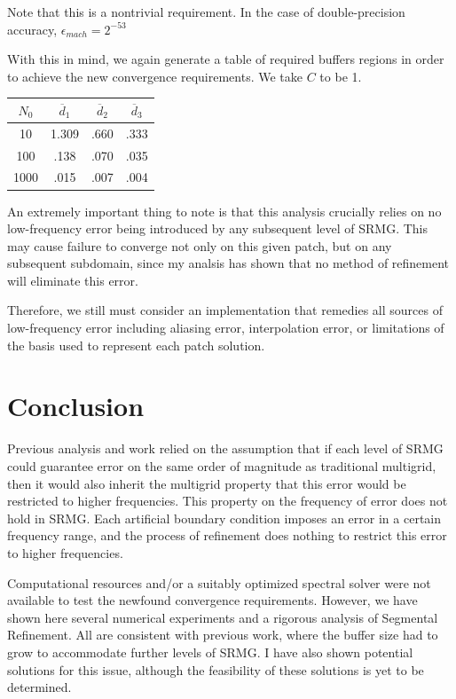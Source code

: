 \documentclass[final]{siamart1116}
\numberwithin{theorem}{section}
\begin{document}
Note that this is a nontrivial requirement. In the case of double-precision accuracy, $\epsilon_{mach} = 2^{-53}$

With this in mind, we again generate a table of required buffers regions in order to achieve the new convergence requirements. We take $C$ to be 1. 

\begin{center}
\begin{tabular}{c | c |  c | c}
$N_0$  & $\overline d_1$ & $\overline d_2$ & $\overline d_3$\\
\hline
10 &  1.309 & .660 & .333\\ 
\hline
100 & .138 & .070 & .035 \\
\hline
1000 & .015   &  .007 & .004\\
\hline
\end{tabular}
\end{center}


An extremely important thing to note is that this analysis crucially relies on no low-frequency error being introduced by any subsequent level of SRMG. This may cause failure to converge not only on this given patch, but on any subsequent subdomain, since my analsis has shown that no method of refinement will eliminate this error. 

Therefore, we still must consider an implementation that remedies all sources of low-frequency error including aliasing error, interpolation error, or limitations of the basis used to represent each patch solution.


\section{Conclusion}\label{sec:conc}

Previous analysis and work relied on the assumption that if each level of SRMG could guarantee error on the same order of magnitude as traditional multigrid, then it would also inherit the multigrid property that this error would be restricted to higher frequencies. This property on the frequency of error does not hold in SRMG. Each artificial boundary condition imposes an error in a certain frequency range, and the process of refinement does nothing to restrict this error to higher frequencies. 

Computational resources and/or a suitably optimized spectral solver were not available to test the newfound convergence requirements. However, we have shown here several numerical experiments and a rigorous analysis of Segmental Refinement. All are consistent with previous work, where the buffer size had to grow to accommodate further levels of SRMG. I have also shown potential solutions for this issue, although the feasibility of these solutions is yet to be determined. 
\end{document}
